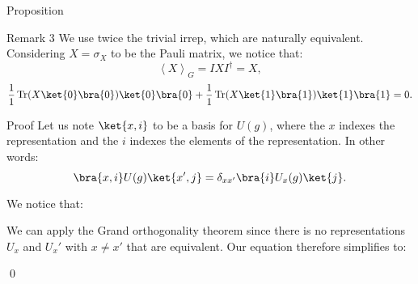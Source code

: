 \documentclass[a4paper]{article}
\begin{document}
\begin{parag}{Proposition}
\begin{subparag}{Remark 3}
        We use twice the trivial irrep, which are naturally equivalent. Considering $X = \sigma_X$ to be the Pauli matrix, we notice that: 
        \[\left\langle X \right\rangle_G = I X I^{\dagger} = X,\]
        \[\frac{1}{1} \Tr\left(X \ket{0}\bra{0}\right) \ket{0}\bra{0} + \frac{1}{1} \Tr\left(X \ket{1}\bra{1}\right) \ket{1}\bra{1} = 0.\]
    \end{subparag}

    \begin{subparag}{Proof}
        Let us note $\ket{x, i}$ to be a basis for $U\left(g\right)$, where the $x$ indexes the representation and the $i$ indexes the elements of the representation. In other words: 
        \[\bra{x, i} U\left(g\right) \ket{x', j} = \delta_{x x'} \bra{i} U_x\left(g\right) \ket{j}.\]

        We notice that: 
        
        We can apply the Grand orthogonality theorem since there is no representations $U_x$ and $U_x'$ with $x \neq x'$ that are equivalent. Our equation therefore simplifies to: 

        \qed
    \end{subparag}
\end{parag}
\end{document}
